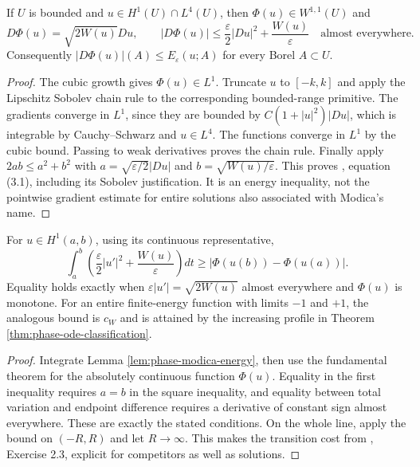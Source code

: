 \begin{lemma}\label{lem:phase-modica-energy}
If $U$ is bounded and $u\in H^1(U)\cap L^4(U)$, then $\Phi(u)\in W^{1,1}(U)$ and
\[
 D\Phi(u)=\sqrt{2W(u)}Du,\qquad
 |D\Phi(u)|\leq\frac\varepsilon2|Du|^2+\frac{W(u)}\varepsilon
 \quad\text{almost everywhere}.
\]
Consequently $|D\Phi(u)|(A)\leq E_\varepsilon(u;A)$ for every Borel $A\subset U$.
\end{lemma}
\begin{proof}
The cubic growth gives $\Phi(u)\in L^1$. Truncate $u$ to $[-k,k]$ and apply the Lipschitz Sobolev chain rule to the corresponding bounded-range primitive. The gradients converge in $L^1$, since they are bounded by $C(1+|u|^2)|Du|$, which is integrable by Cauchy--Schwarz and $u\in L^4$. The functions converge in $L^1$ by the cubic bound. Passing to weak derivatives proves the chain rule. Finally apply $2ab\leq a^2+b^2$ with $a=\sqrt{\varepsilon/2}|Du|$ and $b=\sqrt{W(u)/\varepsilon}$. This proves \cite{ChAC}, equation (3.1), including its Sobolev justification. It is an energy inequality, not the pointwise gradient estimate for entire solutions also associated with Modica's name.
\end{proof}

\begin{proposition}\label{prop:phase-transition-cost}
For $u\in H^1(a,b)$, using its continuous representative,
\[
 \int_a^b\left(\frac\varepsilon2|u'|^2+\frac{W(u)}\varepsilon\right)dt
 \geq |\Phi(u(b))-\Phi(u(a))|.
\]
Equality holds exactly when $\varepsilon|u'|=\sqrt{2W(u)}$ almost everywhere and $\Phi(u)$ is monotone. For an entire finite-energy function with limits $-1$ and $+1$, the analogous bound is $c_W$ and is attained by the increasing profile in Theorem \ref{thm:phase-ode-classification}.
\end{proposition}
\begin{proof}
Integrate Lemma \ref{lem:phase-modica-energy}, then use the fundamental theorem for the absolutely continuous function $\Phi(u)$. Equality in the first inequality requires $a=b$ in the square inequality, and equality between total variation and endpoint difference requires a derivative of constant sign almost everywhere. These are exactly the stated conditions. On the whole line, apply the bound on $(-R,R)$ and let $R\to\infty$. This makes the transition cost from \cite{ChAC}, Exercise 2.3, explicit for competitors as well as solutions.
\end{proof}

